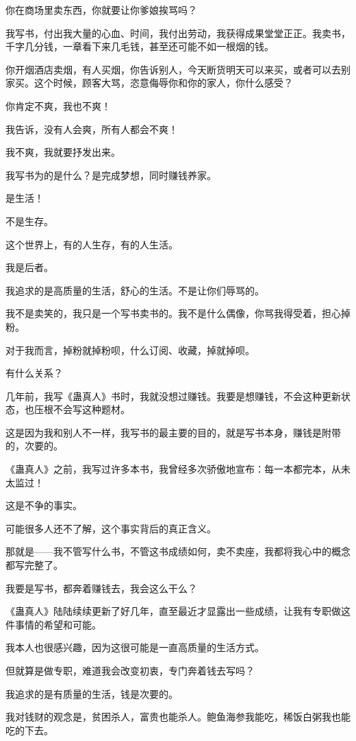 \begin{this_body}
你在商场里卖东西，你就要让你爹娘挨骂吗？

我写书，付出我大量的心血、时间，我付出劳动，我获得成果堂堂正正。我卖书，千字几分钱，一章看下来几毛钱，甚至还可能不如一根烟的钱。

你开烟酒店卖烟，有人买烟，你告诉别人，今天断货明天可以来买，或者可以去别家买。这个时候，顾客大骂，恣意侮辱你和你的家人，你什么感受？

你肯定不爽，我也不爽！

我告诉，没有人会爽，所有人都会不爽！

我不爽，我就要抒发出来。

我写书为的是什么？是完成梦想，同时赚钱养家。

是生活！

不是生存。

这个世界上，有的人生存，有的人生活。

我是后者。

我追求的是高质量的生活，舒心的生活。不是让你们辱骂的。

我不是卖笑的，我只是一个写书卖书的。我不是什么偶像，你骂我得受着，担心掉粉。

对于我而言，掉粉就掉粉呗，什么订阅、收藏，掉就掉呗。

有什么关系？

几年前，我写《蛊真人》书时，我就没想过赚钱。我要是想赚钱，不会这种更新状态，也压根不会写这种题材。

这是因为我和别人不一样，我写书的最主要的目的，就是写书本身，赚钱是附带的，次要的。

《蛊真人》之前，我写过许多本书，我曾经多次骄傲地宣布：每一本都完本，从未太监过！

这是不争的事实。

可能很多人还不了解，这个事实背后的真正含义。

那就是——我不管写什么书，不管这书成绩如何，卖不卖座，我都将我心中的概念都写完整了。

我要是写书，都奔着赚钱去，我会这么干么？

《蛊真人》陆陆续续更新了好几年，直至最近才显露出一些成绩，让我有专职做这件事情的希望和可能。

我本人也很感兴趣，因为这很可能是一直高质量的生活方式。

但就算是做专职，难道我会改变初衷，专门奔着钱去写吗？

我追求的是有质量的生活，钱是次要的。

我对钱财的观念是，贫困杀人，富贵也能杀人。鲍鱼海参我能吃，稀饭白粥我也能吃的下去。


\end{this_body}
